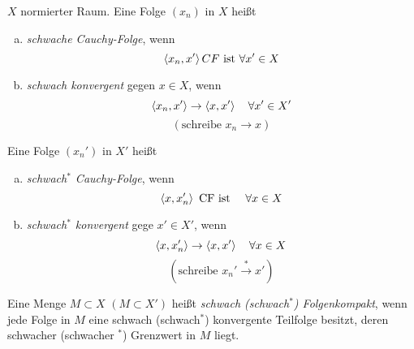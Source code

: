 \documentclass[ngerman]{report}
\begin{document}
	\begin{definition}
		$X$ normierter Raum. 
		Eine Folge $(x_n)$ in $X$ heißt 
			\begin{enumerate}[a)]
				\item \textit{schwache Cauchy-Folge}, wenn 
					$$ \left \langle x_n,x' \right \rangle CF \text{ ist }  \forall x' \in X$$
				\item \textit{schwach konvergent} gegen $x\in X$, wenn
					$$ \left \langle x_n, x' \right \rangle \to \left \langle x,x' \right \rangle \quad \forall x' \in X'$$
					$$(\text{schreibe } x_n \longrightarrow x )$$
			\end{enumerate}
		Eine Folge $(x_n')$ in $X'$ heißt
			\begin{enumerate}[a)]
				\item \textit{schwach$^*$ Cauchy-Folge}, wenn 
					$$ \left \langle x,x_n' \right \rangle \text{ CF ist } \quad \forall x\in X$$
				\item \textit{schwach$^*$ konvergent} gege $x' \in X'$, wenn
					$$ \left \langle x,x_n' \right \rangle \to \left \langle x,x' \right \rangle \quad \forall x\in X $$
					$$(\text{schreibe } x_n' \overset{*}{\longrightarrow} x')$$
			\end{enumerate}
			Eine Menge $M\subset X$ $(M \subset X')$ heißt \textit{schwach (schwach$^*$) Folgenkompakt}, wenn jede Folge in $M$ eine schwach (schwach$^*$) konvergente Teilfolge besitzt, deren schwacher (schwacher $^*$) Grenzwert in $M$ liegt.
		

	\end{definition}
\end{document}

